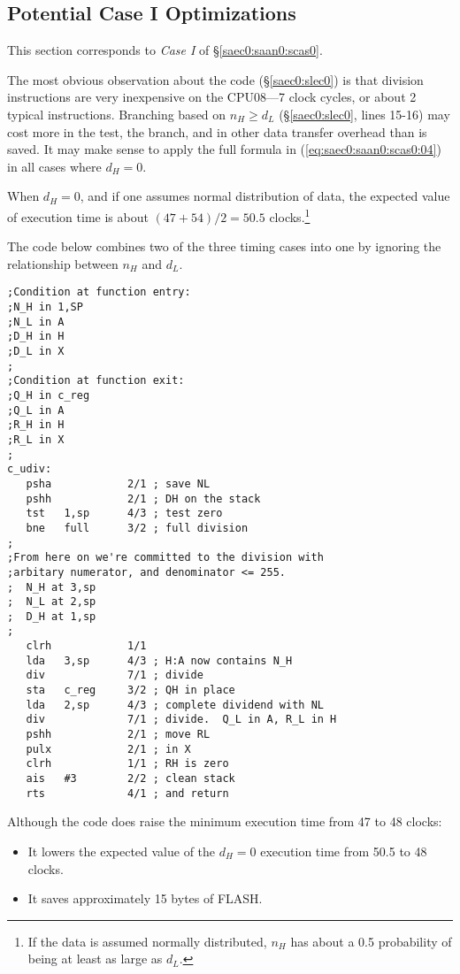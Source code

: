 \documentclass[letterpaper,10pt,titlepage]{article}
\begin{document}

\subsection{Potential Case I Optimizations}
\label{spop0:scas0}

This section corresponds to \emph{Case I} of \S{}\ref{saec0:saan0:scas0}.

The most obvious observation about the code (\S{}\ref{saec0:slec0}) is that
division instructions are very inexpensive on the CPU08---7 clock cycles,
or about 2 typical instructions.  Branching based on
$n_H \geq d_L$ 
(\S{}\ref{saec0:slec0}, lines 15-16)
may cost more in the test, the branch, and in other
data transfer overhead than is saved.  It may make sense to apply the
full formula in (\ref{eq:saec0:saan0:scas0:04}) in all cases where
$d_H = 0$.

When $d_H = 0$, and if one assumes normal distribution of data, the expected
value of execution time is about $(47+54)/2 = 50.5$ clocks.\footnote{If the
data is assumed normally distributed, $n_H$ has about a 0.5 probability of being at least as large
as $d_L$.}

The code below combines two of the three timing cases into one by ignoring the
relationship between $n_H$ and $d_L$.

\begin{verbatim}
;Condition at function entry:
;N_H in 1,SP
;N_L in A
;D_H in H
;D_L in X
;
;Condition at function exit:
;Q_H in c_reg
;Q_L in A
;R_H in H
;R_L in X
;
c_udiv:
   psha            2/1 ; save NL
   pshh            2/1 ; DH on the stack
   tst   1,sp      4/3 ; test zero
   bne   full      3/2 ; full division
;
;From here on we're committed to the division with
;arbitary numerator, and denominator <= 255.
;  N_H at 3,sp
;  N_L at 2,sp
;  D_H at 1,sp
;
   clrh            1/1
   lda   3,sp      4/3 ; H:A now contains N_H
   div             7/1 ; divide
   sta   c_reg     3/2 ; QH in place
   lda   2,sp      4/3 ; complete dividend with NL
   div             7/1 ; divide.  Q_L in A, R_L in H
   pshh            2/1 ; move RL
   pulx            2/1 ; in X
   clrh            1/1 ; RH is zero
   ais   #3        2/2 ; clean stack
   rts             4/1 ; and return
\end{verbatim}

Although the code does raise the minimum execution time from 47 to
48 clocks:

\begin{itemize}
\item It lowers the expected value of the $d_H=0$ execution time from
      50.5 to 48 clocks.
\item It saves approximately 15 bytes of FLASH.
\end{itemize}
\end{document}
